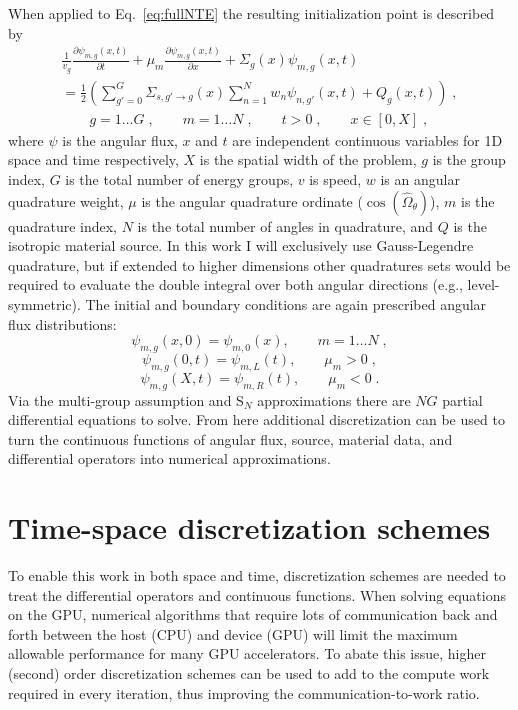 When applied to Eq.~\eqref{eq:fullNTE} the resulting initialization point is described by
\begin{multline}
    \label{sn_nte_int}
    \frac{1}{v_g} \frac{\partial \psi_{m,g}(x,t)}{\partial t} + \mu_m \frac{\partial \psi_{m,g}(x,t)}{\partial x} + \Sigma_g(x) \psi_{m,g}(x,t)  \\
     = \frac{1}{2} \left( \sum\limits_{g' = 0}^G \Sigma_{s, g'\to g}(x) \sum\limits_{n=1}^N w_n \psi_{n, g'}(x,t) + Q_g(x,t) \right) \;, \\
    \qquad g=1 \ldots G \;, \qquad m=1 \ldots N \;, \qquad t > 0 \;, \qquad x \in [0,X] \;,
\end{multline}
where $\psi$ is the angular flux, $x$ and $t$ are independent continuous variables for 1D space and time respectively, $X$ is the spatial width of the problem, $g$ is the group index, $G$ is the total number of energy groups, $v$ is speed, $w$ is an angular quadrature weight, $\mu$ is the angular quadrature ordinate ($\cos(\hat{\Omega}_\theta)$), $m$ is the quadrature index, $N$ is the total number of angles in quadrature, and $Q$ is the isotropic material source.
In this work I will exclusively use Gauss-Legendre quadrature, but if extended to higher dimensions other quadratures sets would be required to evaluate the double integral over both angular directions (e.g., level-symmetric). 
The initial and boundary conditions are again prescribed angular flux distributions:
\begin{equation*}
    \psi_{m,g}(x,0) = \psi_{m,0}(x), \qquad m=1 \ldots N \;,
\end{equation*}
\begin{equation*}
    \psi_{m,g}(0,t) = \psi_{m,L}(t), \qquad \mu_m >0 \;,
\end{equation*}
\begin{equation*}
    \psi_{m,g}(X,t) = \psi_{m,R}(t), \qquad \mu_m <0 \;.
\end{equation*}
Via the multi-group assumption and S$_N$ approximations there are $NG$ partial differential equations to solve.
From here additional discretization can be used to turn the continuous functions of angular flux, source, material data, and differential operators into numerical approximations.

\section{Time-space discretization schemes}

To enable this work in both space and time, discretization schemes are needed to treat the differential operators and continuous functions.
When solving equations on the GPU, numerical algorithms that require lots of communication back and forth between the host (CPU) and device (GPU) will limit the maximum allowable performance for many GPU accelerators.
To abate this issue, higher (second) order discretization schemes can be used to add to the compute work required in every iteration, thus improving the communication-to-work ratio.

